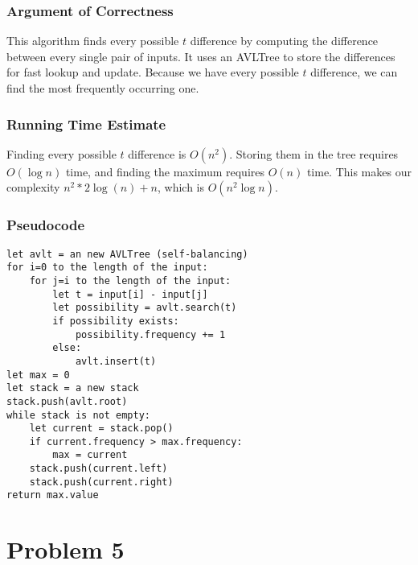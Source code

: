 \documentclass[letterpaper, 12pt]{math}
\begin{document}
\subsubsection*{Argument of Correctness}
This algorithm finds every possible \( t \) difference by computing the
difference between every single pair of inputs. It uses an AVLTree to store the
differences for fast lookup and update. Because we have every possible \( t \)
difference, we can find the most frequently occurring one.

\subsubsection*{Running Time Estimate}
Finding every possible \( t \) difference is \( O(n^2) \). Storing them in the
tree requires \( O(\log n) \) time, and finding the maximum requires \( O(n) \)
time. This makes our complexity \( n^2*2\log(n)+n \), which is
\( O(n^2\log n) \).

\subsubsection*{Pseudocode}
\begin{lstlisting}
let avlt = an new AVLTree (self-balancing)
for i=0 to the length of the input:
    for j=i to the length of the input:
        let t = input[i] - input[j]
        let possibility = avlt.search(t)
        if possibility exists:
            possibility.frequency += 1
        else:
            avlt.insert(t)
let max = 0
let stack = a new stack
stack.push(avlt.root)
while stack is not empty:
    let current = stack.pop()
    if current.frequency > max.frequency:
        max = current
    stack.push(current.left)
    stack.push(current.right)
return max.value
\end{lstlisting}

\section*{Problem 5}
\end{document}
